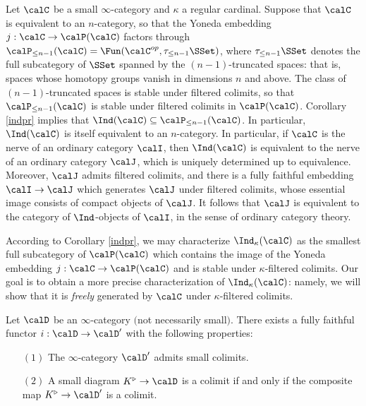 \begin{remark}
Let $\calC$ be a small $\infty$-category and $\kappa$ a regular cardinal. Suppose
that $\calC$ is equivalent to an $n$-category, so that the Yoneda embedding
$j: \calC \rightarrow \calP(\calC)$ factors through $\calP_{\leq n-1}(\calC) = \Fun(\calC^{op}, \tau_{\leq n-1} \SSet)$, where
$\tau_{\leq n-1} \SSet$ denotes the full subcategory of $\SSet$ spanned by the
$(n-1)$-truncated spaces: that is, spaces whose homotopy groups vanish in dimensions $n$ and above. The class of $(n-1)$-truncated spaces is stable under filtered colimits, so that
$\calP_{\leq n-1}(\calC)$ is stable under filtered colimits in $\calP(\calC)$. Corollary \ref{indpr} implies that $\Ind(\calC) \subseteq \calP_{\leq n-1}(\calC)$. In particular, $\Ind(\calC)$ is itself equivalent to an $n$-category. In particular, if $\calC$ is the nerve of an ordinary category $\calI$, then $\Ind(\calC)$ is equivalent to the nerve of an ordinary category $\calJ$, which is uniquely determined up to equivalence. Moreover, $\calJ$ admits filtered colimits, and there is a fully faithful embedding $\calI \rightarrow \calJ$ which generates $\calJ$ under filtered colimits, whose essential image consists of compact objects of $\calJ$. It follows
that $\calJ$ is equivalent to the category of $\Ind$-objects of $\calI$, in the sense of ordinary category theory.
\end{remark}

According to Corollary \ref{indpr}, we may characterize $\Ind_{\kappa}(\calC)$ as the smallest full subcategory of $\calP(\calC)$ which contains the image of the Yoneda embedding $j: \calC \rightarrow \calP(\calC)$ and is stable under $\kappa$-filtered colimits. Our goal is to obtain a more precise characterization of $\Ind_{\kappa}(\calC)$: namely, we will show that it is {\em freely} generated by $\calC$ under $\kappa$-filtered colimits. 

\begin{lemma}\label{diverti}
Let $\calD$ be an $\infty$-category $($not necessarily small$)$. There exists a fully faithful functor
$i: \calD \rightarrow \calD'$ with the following properties:
\begin{itemize}
\item[$(1)$] The $\infty$-category $\calD'$ admits small colimits.
\item[$(2)$] A small diagram $K^{\triangleright} \rightarrow \calD$ is a colimit if and only if the composite map $K^{\triangleright} \rightarrow \calD'$ is a colimit.
\end{itemize}
\end{lemma}

